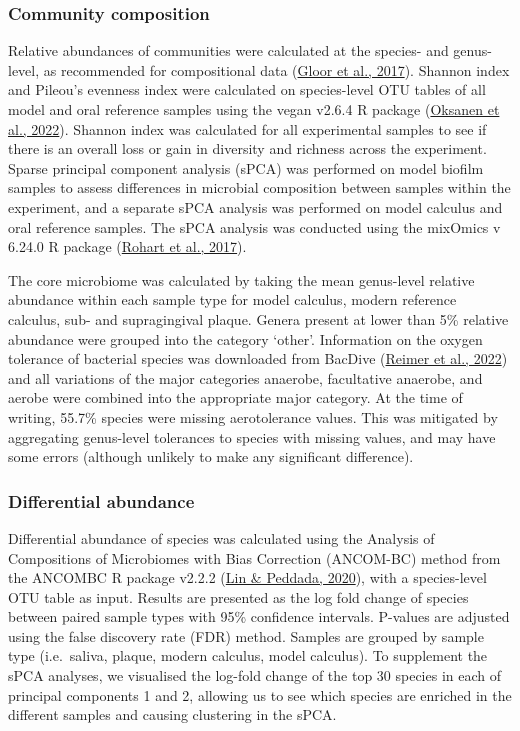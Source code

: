 \documentclass[
  letterpaper,
]{book}
\begin{document}
\hypertarget{community-composition}{%
\subsubsection{Community composition}\label{community-composition}}

Relative abundances of communities were calculated at the species- and
genus-level, as recommended for compositional data
(\protect\hyperlink{ref-gloorMicrobiomeDatasets2017}{Gloor et al.,
2017}). Shannon index and Pileou's evenness index were calculated on
species-level OTU tables of all model and oral reference samples using
the vegan v2.6.4 R package (\protect\hyperlink{ref-Rvegan}{Oksanen et
al., 2022}). Shannon index was calculated for all experimental samples
to see if there is an overall loss or gain in diversity and richness
across the experiment. Sparse principal component analysis (sPCA) was
performed on model biofilm samples to assess differences in microbial
composition between samples within the experiment, and a separate sPCA
analysis was performed on model calculus and oral reference samples. The
sPCA analysis was conducted using the mixOmics v 6.24.0 R package
(\protect\hyperlink{ref-RmixOmics}{Rohart et al., 2017}).

The core microbiome was calculated by taking the mean genus-level
relative abundance within each sample type for model calculus, modern
reference calculus, sub- and supragingival plaque. Genera present at
lower than 5\% relative abundance were grouped into the category
`other'. Information on the oxygen tolerance of bacterial species was
downloaded from BacDive
(\protect\hyperlink{ref-reimerBacDive2022}{Reimer et al., 2022}) and all
variations of the major categories anaerobe, facultative anaerobe, and
aerobe were combined into the appropriate major category. At the time of
writing, 55.7\% species were missing aerotolerance values. This was
mitigated by aggregating genus-level tolerances to species with missing
values, and may have some errors (although unlikely to make any
significant difference).

\hypertarget{differential-abundance}{%
\subsubsection{Differential abundance}\label{differential-abundance}}

Differential abundance of species was calculated using the Analysis of
Compositions of Microbiomes with Bias Correction (ANCOM-BC) method from
the ANCOMBC R package v2.2.2 (\protect\hyperlink{ref-linANCOMBC2020}{Lin
\& Peddada, 2020}), with a species-level OTU table as input. Results are
presented as the log fold change of species between paired sample types
with 95\% confidence intervals. P-values are adjusted using the false
discovery rate (FDR) method. Samples are grouped by sample type
(i.e.~saliva, plaque, modern calculus, model calculus). To supplement
the sPCA analyses, we visualised the log-fold change of the top 30
species in each of principal components 1 and 2, allowing us to see
which species are enriched in the different samples and causing
clustering in the sPCA.
\end{document}
